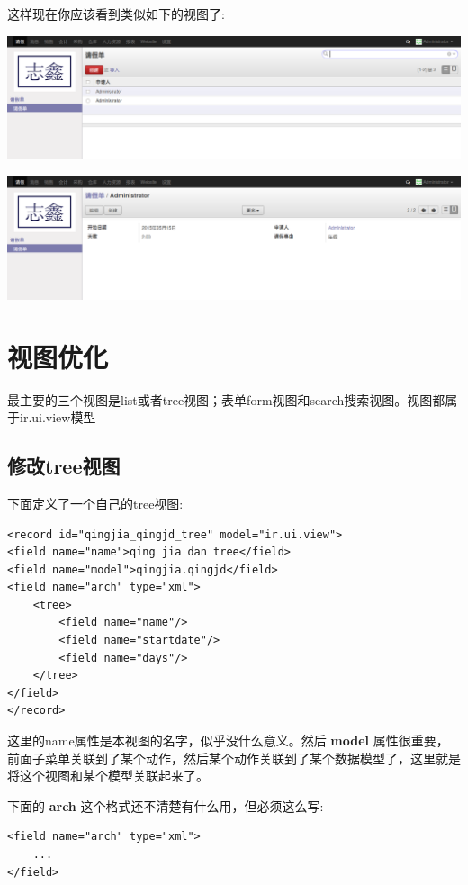 \documentclass[11pt,a4paper]{sphinxmanual}
\begin{document}
这样现在你应该看到类似如下的视图了:

\includegraphics[keepaspectratio,max width=0.95\linewidth]{images/请假单_tree01.png}


\includegraphics[keepaspectratio,max width=0.95\linewidth]{images/请假单_form01.png}



\section{视图优化}
\label{sec-6-4}
最主要的三个视图是list或者tree视图；表单form视图和search搜索视图。视图都属于ir.ui.view模型


\subsection{修改tree视图}
\label{sec-6-4-1}
下面定义了一个自己的tree视图:
\begin{Verbatim}
<record id="qingjia_qingjd_tree" model="ir.ui.view">
<field name="name">qing jia dan tree</field>
<field name="model">qingjia.qingjd</field>
<field name="arch" type="xml">
    <tree>
        <field name="name"/>
        <field name="startdate"/>
        <field name="days"/>
    </tree>
</field>
</record>
\end{Verbatim}

这里的name属性是本视图的名字，似乎没什么意义。然后 \textbf{model} 属性很重要，前面子菜单关联到了某个动作，然后某个动作关联到了某个数据模型了，这里就是将这个视图和某个模型关联起来了。

下面的 \textbf{arch} 这个格式还不清楚有什么用，但必须这么写:
\begin{Verbatim}
<field name="arch" type="xml">
    ...
</field>
\end{Verbatim}
\end{document}
